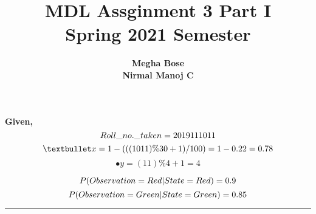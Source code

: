 \documentclass{article}
\title{MDL Assginment 3 Part I\\Spring 2021 Semester}
\author{\textbf{Megha Bose }\\\textbf{Nirmal Manoj C }}
\date{}
\begin{document}
\maketitle

\textbf{Given,}\\
\begin{equation}
Roll\_no.\_taken = 2019111011\\
\end{equation}
\begin{equation}
    • x = 1 - (((1011)\%30 + 1)/100) = 1 - 0.22 = 0.78\\
\end{equation}
\begin{equation}
    • y = (11)\%4 + 1 = 4
\end{equation}

\begin{equation}
    P (Observation = Red|State = Red) = 0.9\\
\end{equation}
\begin{equation}
    P (Observation = Green|State = Green) = 0.85\\
\end{equation}
\par\noindent\rule{\textwidth}{0.4pt}
\\
\end{document}
